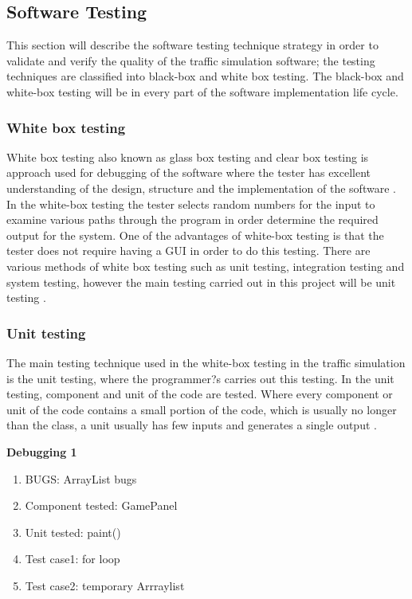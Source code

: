 \subsection{Software Testing}

\indent This section will describe the software testing technique strategy in order to validate and verify the quality of the traffic simulation software; the testing techniques are classified into black-box and white box testing. The black-box and white-box testing will be in every part of the software implementation life cycle.

 \subsubsection{White box testing}
\indent White box testing also known as glass box testing and clear box testing is approach used for debugging of the software where the tester has excellent understanding of the design, structure and the  implementation of the software . In the white-box testing the tester selects random numbers for the input to examine various paths through the program in order determine the required output for the system. One of the advantages of white-box testing is that the tester does not require having a GUI in order to do this testing. There are various methods of white box testing such as unit testing, integration testing and system testing, however the main testing carried out in this project will be unit testing \cite{mauro}.

\subsubsection{Unit testing}
\indent The main testing technique used in the white-box testing in the traffic simulation is the unit testing, where the programmer?s carries out this testing. In the unit testing, component and unit of the code are tested. Where every component or unit of the code contains a small portion of the code, which is usually no longer than the class, a unit usually has few inputs and generates a single output \cite{mauro}.\newline

\textbf{Debugging 1}
\begin{enumerate}
\item {BUGS:} ArrayList bugs
\item Component tested: GamePanel
\item Unit tested: paint()
\item Test case1: for loop
\item Test case2: temporary Arrraylist
\end{enumerate} 

